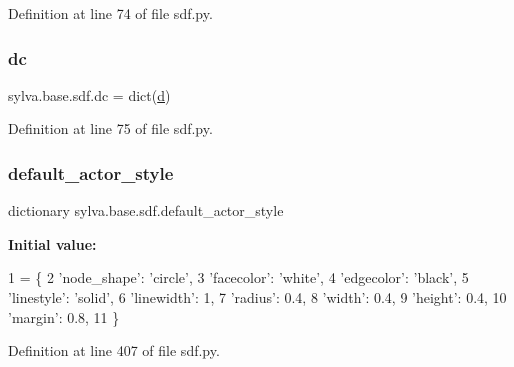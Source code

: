Definition at line 74 of file sdf.\+py.

\mbox{\label{namespacesylva_1_1base_1_1sdf_a1e21c34d5788bcf15b3fb64cf5381843}} 
\subsubsection{\texorpdfstring{dc}{dc}}
{\footnotesize\ttfamily sylva.\+base.\+sdf.\+dc = dict(\hyperlink{namespacesylva_1_1base_1_1sdf_a7cf3fa067b15b3a601f61564012ddaf1}{d})}



Definition at line 75 of file sdf.\+py.

\mbox{\label{namespacesylva_1_1base_1_1sdf_a39d9eb96b3c8367d46f62630c694532a}} 
\subsubsection{\texorpdfstring{default\+\_\+actor\+\_\+style}{default\_actor\_style}}
{\footnotesize\ttfamily dictionary sylva.\+base.\+sdf.\+default\+\_\+actor\+\_\+style}

{\bfseries Initial value\+:}
\begin{DoxyCode}
1 =  \{
2         \textcolor{stringliteral}{'node\_shape'}: \textcolor{stringliteral}{'circle'},
3         \textcolor{stringliteral}{'facecolor'}: \textcolor{stringliteral}{'white'},
4         \textcolor{stringliteral}{'edgecolor'}: \textcolor{stringliteral}{'black'},
5         \textcolor{stringliteral}{'linestyle'}: \textcolor{stringliteral}{'solid'},
6         \textcolor{stringliteral}{'linewidth'}: 1,
7         \textcolor{stringliteral}{'radius'}: 0.4,
8         \textcolor{stringliteral}{'width'}: 0.4,
9         \textcolor{stringliteral}{'height'}: 0.4,
10         \textcolor{stringliteral}{'margin'}: 0.8,
11     \}
\end{DoxyCode}


Definition at line 407 of file sdf.\+py.

\mbox{\label{namespacesylva_1_1base_1_1sdf_a2fc7e4f9875075ae2cc4d82650265733}} 
